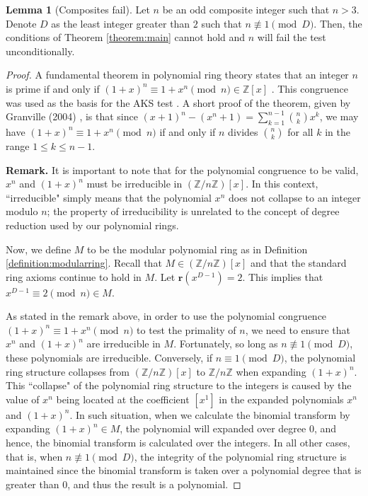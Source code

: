 \documentclass{article}
\theoremstyle{plain}
\theoremstyle{definition}
\newtheorem{lemma}{Lemma}
\newcommand{\redu}{\textbf{r}}
\newcommand{\Z}{\mathbb{Z}}
\newcommand{\Zn}{\Z/n\Z}
\newcommand{\Mx}{M}
\begin{document}
\begin{lemma}[Composites fail] \label{lemma:composites}
Let $n$ be an odd composite integer such that $n > 3$. Denote $D$ as the least integer greater than $2$ such that $n \not\equiv 1 \pmod{D}$. Then, the conditions of Theorem \ref{theorem:main} cannot hold and $n$ will fail the test unconditionally.
\end{lemma}
\begin{proof}
A fundamental theorem in polynomial ring theory states that an integer $n$ is prime if and only if $(1 + x)^n \equiv 1 + x^n \pmod{n} \in \Z[x]$ \cite{granville2004primes}. This congruence was used as the basis for the AKS test \cite{aks2002}. A short proof of the theorem, given by Granville (2004) \cite{granville2004primes}, is that since $(x + 1)^n - (x^n + 1) = \sum_{k=1}^{n-1} \binom{n}{k} x^k$, we may have $(1 + x)^n \equiv 1 + x^n \pmod{n}$ if and only if $n$ divides $\binom{n}{k}$ for all $k$ in the range $1 \leq k \leq n-1$.

\textbf{Remark.} It is important to note that for the polynomial congruence to be valid, $x^n$ and $(1+x)^n$ must be irreducible in $(\Zn)[x]$. In this context, ``irreducible" simply means that the polynomial $x^n$ does not collapse to an integer modulo $n$; the property of irreducibility is unrelated to the concept of degree reduction used by our polynomial rings.

Now, we define $\Mx$ to be the modular polynomial ring as in Definition \ref{definition:modularring}. Recall that $M \in (\Zn)[x]$ and that the standard ring axioms continue to hold in $\Mx$. Let $\redu(x^{D-1}) = 2$. This implies that $x^{D-1} \equiv 2 \pmod{n} \in \Mx$.

As stated in the remark above, in order to use the polynomial congruence $(1 + x)^n \equiv 1 + x^n \pmod{n}$ to test the primality of $n$, we need to ensure that $x^n$ and $(1+x)^n$ are irreducible in $\Mx$. Fortunately, so long as $n \not\equiv 1 \pmod{D}$, these polynomials are irreducible. Conversely, if $n \equiv 1 \pmod{D}$, the polynomial ring structure collapses from $(\Zn)[x]$ to $\Zn$ when expanding $(1 + x)^n$. This ``collapse" of the polynomial ring structure to the integers is caused by the value of $x^n$ being located at the coefficient $[x^1]$ in the expanded polynomials $x^n$ and $(1 + x)^n$. In such situation, when we calculate the binomial transform by expanding $(1 + x)^n \in \Mx$, the polynomial will expanded over degree $0$, and hence, the binomial transform is calculated over the integers. In all other cases, that is, when $n \not\equiv 1 \pmod{D}$, the integrity of the polynomial ring structure is maintained since the binomial transform is taken over a polynomial degree that is greater than $0$, and thus the result is a polynomial.


\end{proof}
\end{document}
